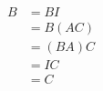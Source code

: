 \liftdisplaystyle
\begin{align*}
    B &= BI \\
    &= B(AC) \\
    &= (BA)C \\
    &= IC \\
    &= C
\end{align*}
